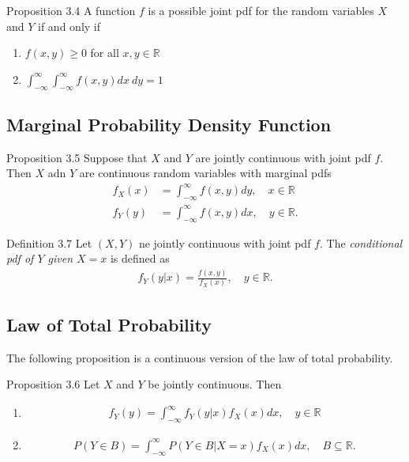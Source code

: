 \begin{boks}{Proposition 3.4}
A function $f$ is a possible joint pdf for the random variables $X$ and $Y$ if and only if
\begin{enumerate}
    \item $f(x, y) \geq 0$ for all $x,y \in \mathbb{R}$
    \item $\int_{-\infty}^\infty \int_{-\infty}^\infty f(x,y)dx\  dy = 1$
\end{enumerate}
\end{boks}
\newpage
\subsection{Marginal Probability Density Function}

\begin{boks}{Proposition 3.5}
Suppose that $X$ and $Y$ are jointly continuous with joint pdf $f$. Then $X$ adn $Y$ are continuous random variables with marginal pdfs
\begin{align*}
    f_X(x) &= \int_{-\infty}^\infty f(x, y) dy, \quad x\in\mathbb{R} \\
    f_Y(y) &= \int_{-\infty}^\infty f(x,y) dx, \quad y\in\mathbb{R}.
\end{align*}
\end{boks}

\begin{boks}{Definition 3.7}
Let $(X, Y)$ ne jointly continuous with joint pdf $f$. The \textit{conditional pdf of $Y$ given $X=x$} is defined as
\begin{align*}
    f_Y(y|x) = \frac{f(x,y)}{f_X(x)}, \quad y\in\mathbb{R}.
\end{align*}
\end{boks}
\vspace{-5mm}
\subsection{Law of Total Probability}
The following proposition is a continuous version of the law of total probability.

\begin{boks}{Proposition 3.6}
Let $X$ and $Y$ be jointly continuous. Then
\begin{enumerate}
    \item
    \begin{align*}
        f_Y(y) = \int_{-\infty}^\infty f_Y(y|x)f_X(x)dx, \quad y\in\mathbb{R}
    \end{align*}
    \item
    \begin{align*}
        P(Y \in B) = \int_{-\infty}^\infty P(Y \in B|X = x)f_X(x)dx, \quad B\subseteq\mathbb{R}.
    \end{align*}
\end{enumerate}
\end{boks}


